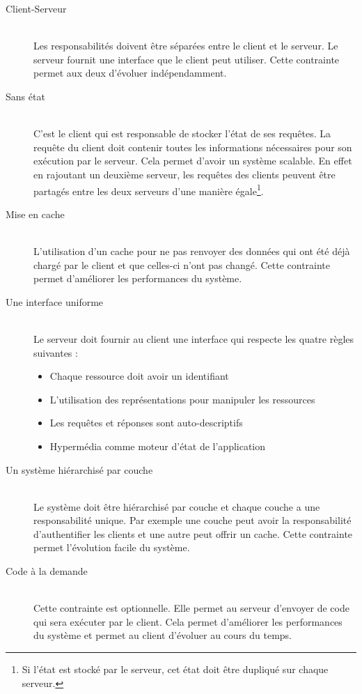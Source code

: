 \begin{description}
\item[Client-Serveur]\hfill\\
Les responsabilités doivent être séparées entre le client et le serveur. Le serveur fournit une interface que le client peut utiliser. Cette contrainte permet aux deux d'évoluer indépendamment.

\item[Sans état]\hfill\\
C'est le client qui est responsable de stocker l'état de ses requêtes. La requête du client doit contenir toutes les informations nécessaires pour son exécution par le serveur. Cela permet d'avoir un système scalable. En effet en rajoutant un deuxième serveur, les requêtes des clients peuvent être partagés entre les deux serveurs d'une manière égale\footnote{Si l'état est stocké par le serveur, cet état doit être dupliqué sur chaque serveur.}.

\item[Mise en cache]\hfill\\
L'utilisation d'un cache pour ne pas renvoyer des données qui ont été déjà chargé par le client et que celles-ci n'ont pas changé. Cette contrainte permet d'améliorer les performances du système.

\item[Une interface uniforme]\hfill\\
Le serveur doit fournir au client une interface qui respecte les quatre règles suivantes :
\begin{itemize}
\item Chaque ressource doit avoir un identifiant
\item L'utilisation des représentations pour manipuler les ressources
\item Les requêtes et réponses sont auto-descriptifs
\item Hypermédia comme moteur d'état de l'application 
\end{itemize} 

\item[Un système hiérarchisé par couche]\hfill\\
Le système doit être hiérarchisé par couche et chaque couche a une responsabilité unique. Par exemple une couche peut avoir la responsabilité d'authentifier les clients et une autre peut offrir un cache. Cette contrainte permet l'évolution facile du système.

\item[Code à la demande]\hfill\\
Cette contrainte est optionnelle. Elle permet au serveur d'envoyer de code qui sera exécuter par le client. Cela permet d'améliorer les performances du système et permet au client d'évoluer au cours du temps.
\end{description}

